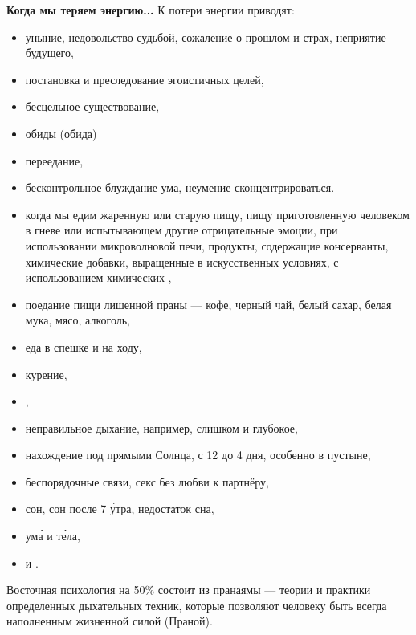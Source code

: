 \textbf{Когда мы теряем энергию...}
К потери энергии приводят:
\begin{itemize}[noitemsep, label=--]
    \item уныние, недовольство судьбой, сожаление о прошлом и страх, неприятие будущего,
    \item  постановка и преследование эгоистичных целей,
    \item бесцельное существование,
    \item обиды (обида)
    \item переедание,
    \item бесконтрольное блуждание ума, неумение сконцентрироваться.
    \item когда мы едим жаренную или старую пищу, пищу приготовленную человеком в гневе или испытывающем другие отрицательные эмоции, при использовании микроволновой печи, продукты, содержащие консерванты, химические добавки, выращенные в искусственных условиях, с использованием химических ,
    \item поедание пищи лишенной праны --- кофе, черный чай, белый сахар, белая мука, мясо, алкоголь,
    \item еда в спешке и на ходу,
    \item курение,
    \item {},
    \item неправильное дыхание, например, слишком  и глубокое,
    \item нахождение под прямыми  Солнца, с 12 до 4 дня, особенно в пустыне,
    \item беспорядочные  связи, секс без любви к партнёру,
    \item {} сон, сон после 7 \'{у}тра, недостаток сна,
    \item {} ум\'{а} и т\'{е}ла,
    \item {} и .
\end{itemize}

Восточная психология на 50\% состоит из пранаямы --- теории и практики определенных дыхательных техник, которые позволяют человеку быть всегда наполненным жизненной силой (Праной).

